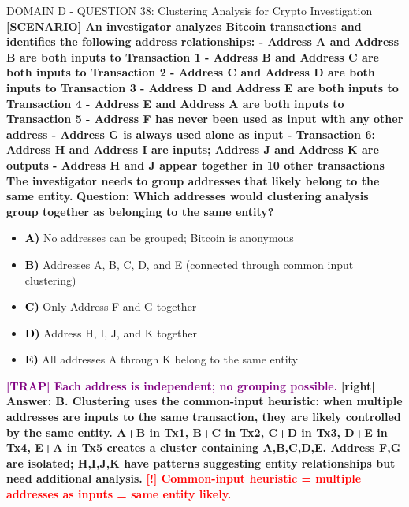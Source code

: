 \documentclass[11pt,a4paper]{beamer}
\newcommand{\redflag}[1]{\textcolor{red}{\textbf{[!] #1}}}
\newcommand{\trap}[1]{\textcolor{purple}{\textbf{[TRAP] #1}}}
\newcommand{\correct}[1]{\textcolor{green!50!black}{\textbf{[right] #1}}}
\newcommand{\scenario}[1]{\textcolor{blue!70!black}{\textbf{[SCENARIO] #1}}}
\newcommand{\option}[1]{\textcolor{black}{\textbf{#1}}}
\begin{document}
\begin{frame}{DOMAIN D - QUESTION 38: Clustering Analysis for Crypto Investigation}
\scenario{An investigator analyzes Bitcoin transactions and identifies the following address relationships:
- Address A and Address B are both inputs to Transaction 1
- Address B and Address C are both inputs to Transaction 2
- Address C and Address D are both inputs to Transaction 3
- Address D and Address E are both inputs to Transaction 4
- Address E and Address A are both inputs to Transaction 5
- Address F has never been used as input with any other address
- Address G is always used alone as input
- Transaction 6: Address H and Address I are inputs; Address J and Address K are outputs
- Address H and J appear together in 10 other transactions
The investigator needs to group addresses that likely belong to the same entity.}
\vspace{0.2cm}
\textbf{Question: Which addresses would clustering analysis group together as belonging to the same entity?}
\vspace{0.1cm}
\begin{itemize}
    \item \option{A)} No addresses can be grouped; Bitcoin is anonymous
    \item \option{B)} Addresses A, B, C, D, and E (connected through common input clustering)
    \item \option{C)} Only Address F and G together
    \item \option{D)} Address H, I, J, and K together
    \item \option{E)} All addresses A through K belong to the same entity
\end{itemize}
\vspace{0.2cm}
\trap{Each address is independent; no grouping possible.}
\correct{Answer: B. Clustering uses the common-input heuristic: when multiple addresses are inputs to the same transaction, they are likely controlled by the same entity. A+B in Tx1, B+C in Tx2, C+D in Tx3, D+E in Tx4, E+A in Tx5 creates a cluster containing A,B,C,D,E. Address F,G are isolated; H,I,J,K have patterns suggesting entity relationships but need additional analysis.}
\redflag{Common-input heuristic = multiple addresses as inputs = same entity likely.}
\end{frame}
\end{document}
